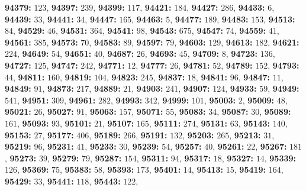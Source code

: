 \textsf{\bfseries 94379:} $123$, \textsf{\bfseries 94397:} $239$, \textsf{\bfseries 94399:} $117$, \textsf{\bfseries 94421:} $184$, \textsf{\bfseries 94427:} $286$, \textsf{\bfseries 94433:} $6$, \textsf{\bfseries 94439:} $33$, \textsf{\bfseries 94441:} $34$, \textsf{\bfseries 94447:} $165$, \textsf{\bfseries 94463:} $5$, \textsf{\bfseries 94477:} $189$, \textsf{\bfseries 94483:} $153$, \textsf{\bfseries 94513:} $84$, \textsf{\bfseries 94529:} $46$, \textsf{\bfseries 94531:} $364$, \textsf{\bfseries 94541:} $98$, \textsf{\bfseries 94543:} $675$, \textsf{\bfseries 94547:} $74$, \textsf{\bfseries 94559:} $41$, \textsf{\bfseries 94561:} $385$, \textsf{\bfseries 94573:} $70$, \textsf{\bfseries 94583:} $89$, \textsf{\bfseries 94597:} $79$, \textsf{\bfseries 94603:} $129$, \textsf{\bfseries 94613:} $182$, \textsf{\bfseries 94621:} $224$, \textsf{\bfseries 94649:} $54$, \textsf{\bfseries 94651:} $40$, \textsf{\bfseries 94687:} $26$, \textsf{\bfseries 94693:} $45$, \textsf{\bfseries 94709:} $8$, \textsf{\bfseries 94723:} $136$, \textsf{\bfseries 94727:} $125$, \textsf{\bfseries 94747:} $242$, \textsf{\bfseries 94771:} $12$, \textsf{\bfseries 94777:} $26$, \textsf{\bfseries 94781:} $52$, \textsf{\bfseries 94789:} $152$, \textsf{\bfseries 94793:} $44$, \textsf{\bfseries 94811:} $160$, \textsf{\bfseries 94819:} $104$, \textsf{\bfseries 94823:} $245$, \textsf{\bfseries 94837:} $18$, \textsf{\bfseries 94841:} $96$, \textsf{\bfseries 94847:} $11$, \textsf{\bfseries 94849:} $91$, \textsf{\bfseries 94873:} $217$, \textsf{\bfseries 94889:} $21$, \textsf{\bfseries 94903:} $241$, \textsf{\bfseries 94907:} $124$, \textsf{\bfseries 94933:} $59$, \textsf{\bfseries 94949:} $541$, \textsf{\bfseries 94951:} $309$, \textsf{\bfseries 94961:} $282$, \textsf{\bfseries 94993:} $342$, \textsf{\bfseries 94999:} $101$, \textsf{\bfseries 95003:} $2$, \textsf{\bfseries 95009:} $48$, \textsf{\bfseries 95021:} $26$, \textsf{\bfseries 95027:} $91$, \textsf{\bfseries 95063:} $157$, \textsf{\bfseries 95071:} $55$, \textsf{\bfseries 95083:} $34$, \textsf{\bfseries 95087:} $30$, \textsf{\bfseries 95089:} $161$, \textsf{\bfseries 95093:} $93$, \textsf{\bfseries 95101:} $21$, \textsf{\bfseries 95107:} $165$, \textsf{\bfseries 95111:} $274$, \textsf{\bfseries 95131:} $63$, \textsf{\bfseries 95143:} $140$, \textsf{\bfseries 95153:} $27$, \textsf{\bfseries 95177:} $406$, \textsf{\bfseries 95189:} $266$, \textsf{\bfseries 95191:} $132$, \textsf{\bfseries 95203:} $265$, \textsf{\bfseries 95213:} $31$, \textsf{\bfseries 95219:} $96$, \textsf{\bfseries 95231:} $41$, \textsf{\bfseries 95233:} $30$, \textsf{\bfseries 95239:} $54$, \textsf{\bfseries 95257:} $40$, \textsf{\bfseries 95261:} $22$, \textsf{\bfseries 95267:} $181$, \textsf{\bfseries 95273:} $39$, \textsf{\bfseries 95279:} $79$, \textsf{\bfseries 95287:} $154$, \textsf{\bfseries 95311:} $94$, \textsf{\bfseries 95317:} $18$, \textsf{\bfseries 95327:} $14$, \textsf{\bfseries 95339:} $126$, \textsf{\bfseries 95369:} $75$, \textsf{\bfseries 95383:} $58$, \textsf{\bfseries 95393:} $173$, \textsf{\bfseries 95401:} $14$, \textsf{\bfseries 95413:} $15$, \textsf{\bfseries 95419:} $164$, \textsf{\bfseries 95429:} $33$, \textsf{\bfseries 95441:} $118$, \textsf{\bfseries 95443:} $122$, 
